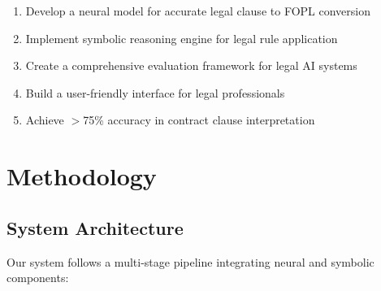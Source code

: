 \documentclass[12pt,a4paper]{article}
\begin{document}
\begin{enumerate}
    \item Develop a neural model for accurate legal clause to FOPL conversion
    \item Implement symbolic reasoning engine for legal rule application
    \item Create a comprehensive evaluation framework for legal AI systems
    \item Build a user-friendly interface for legal professionals
    \item Achieve $>$75\% accuracy in contract clause interpretation
\end{enumerate}

\newpage

\section{Methodology}

\subsection{System Architecture}

Our system follows a multi-stage pipeline integrating neural and symbolic components:
\end{document}
